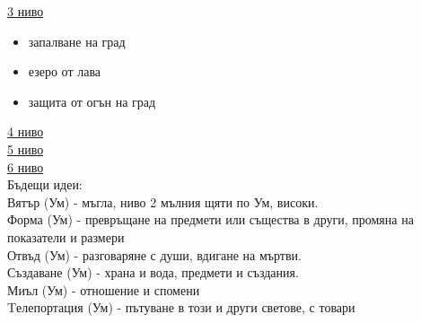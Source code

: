 \underline{3 ниво}
\begin{itemize}
  \item{запалване на град}
  \item{езеро от лава}
  \item{защита от огън на град}
\end{itemize}

\underline{4 ниво}  \\

\underline{5 ниво}  \\

\underline{6 ниво}  \\


Бъдещи идеи:  \\
Вятър (Ум)        - мъгла, ниво 2 мълния щяти по Ум, високи.                                         \\
Форма (Ум)        - превръщане на предмети или същества в други, промяна на показатели и размери     \\
Отвъд (Ум)        - разговаряне с души, вдигане на мъртви.                                           \\
Създаване (Ум)    - храна и вода, предмети и създания.                                               \\
Миъл (Ум)         - отношение и спомени                                                              \\
Tелепортация (Ум) - пътуване в този и други светове, с товари                                        \\






